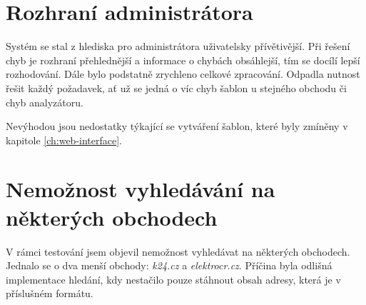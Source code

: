 \documentclass[thesis=B,czech]{FITthesis}[2012/06/26]
\begin{document}
\section{Rozhraní administrátora}
Systém se stal z hlediska pro administrátora uživatelsky přívětivější. Při řešení chyb je rozhraní přehlednější a informace o chybách
obsáhlejší, tím se docílí lepší rozhodování. Dále bylo podstatně zrychleno celkové zpracování. Odpadla nutnost řešit
každý požadavek, ať už se jedná o víc chyb šablon u stejného obchodu či chyb analyzátoru.
\par 
Nevýhodou jsou nedostatky týkající se vytváření šablon, které byly zmíněny v kapitole \ref{ch:web-interface}.

\section{Nemožnost vyhledávání na některých obchodech}
V rámci testování jsem objevil nemožnost vyhledávat na některých obchodech. Jednalo se o dva
menší obchody: \textit{k24.cz} a \textit{elektrocr.cz}. Příčina byla odlišná implementace hledání, kdy nestačilo pouze stáhnout
obsah adresy, která je v příslušném formátu.
\end{document}
